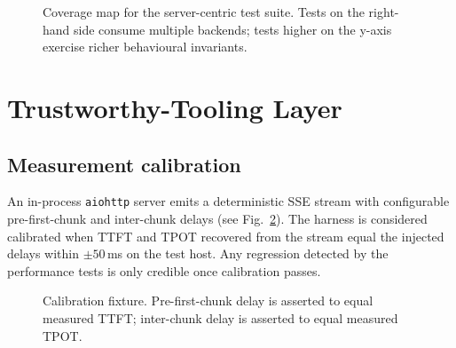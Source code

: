 \documentclass[sigconf,nonacm]{acmart}
\begin{document}
\begin{figure}[h]
\centering
{}
\caption{Coverage map for the server-centric test suite. Tests on the right-hand side consume
multiple backends; tests higher on the y-axis exercise richer behavioural
invariants.}
\label{fig:map}
\end{figure}

\section{Trustworthy-Tooling Layer}
\subsection{Measurement calibration}
An in-process \texttt{aiohttp} server emits a deterministic SSE stream with
configurable pre-first-chunk and inter-chunk delays (see
Fig.~\ref{fig:calib}). The harness is considered calibrated when TTFT and
TPOT recovered from the stream equal the injected delays within $\pm 50$\,ms
on the test host. Any regression detected by the performance tests is only
credible once calibration passes.

\begin{figure}[h]
\centering
{}
\caption{Calibration fixture. Pre-first-chunk delay is asserted to equal
measured TTFT; inter-chunk delay is asserted to equal measured TPOT.}
\label{fig:calib}
\end{figure}
\end{document}
